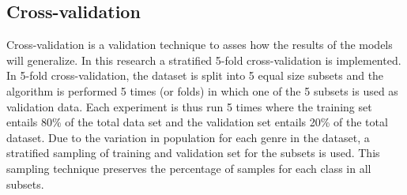 \subsection{Cross-validation}\label{sec:fold}
Cross-validation is a validation technique to asses how the results of the models will generalize. In this research a stratified 5-fold cross-validation is implemented. In 5-fold cross-validation, the dataset is split into 5 equal size subsets and the algorithm is performed 5 times (or folds) in which one of the 5 subsets is used as validation data. Each experiment is thus run 5 times where the training set entails 80\% of the total data set and the validation set entails 20\% of the total dataset. Due to the variation in population for each genre in the dataset, a stratified sampling of training and validation set for the subsets is used. This sampling technique preserves the percentage of samples for each class in all subsets.



